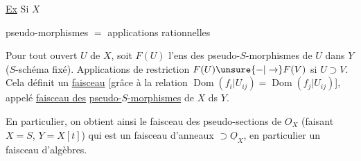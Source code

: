 \uline{Ex} Si $X$   

pseudo-morphismes $=$ applications rationnelles

Pour tout ouvert $U$ de $X$, soit $F(U)$ l'ens des pseudo-$S$-morphismes de $U$ dans $Y$ ($S$-schéma fixé). Applications de restriction $F(U)\unsure{-|\to}F(V)$ si $U\supset V$. Cela  définit un \uline{faisceau} [grâce à la relation $\operatorname{Dom}(f_i|U_{ij})=\operatorname{Dom}(f_j|U_{ij})$], appelé \uline{faisceau des}  \uline{pseudo-$S$-morphismes} de $X$ ds $Y$.

En particulier, on obtient ainsi le faisceau des pseudo-sections de $O_X$ (faisant $X=S$, $Y=X[t]$) qui est un faisceau d'anneaux $\supset\underline O_X$, en particulier un faisceau d'algèbres.


